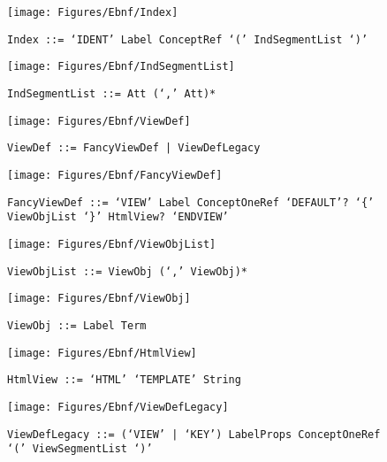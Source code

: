  \begin{figure}[H]
  \centering
  \texttt{[image: Figures/Ebnf/Index]}
  \caption*{\texttt{Index \small::=  `IDENT' Label ConceptRef `(' IndSegmentList `)'}}
  \label{fig:ebnf-Index}
 \end{figure}

 \begin{figure}[H]
  \centering
  \texttt{[image: Figures/Ebnf/IndSegmentList]}
  \caption*{\texttt{IndSegmentList \small::=  Att (`,' Att)*}}
  \label{fig:ebnf-IndSegmentList}
 \end{figure}

 \begin{figure}[H]
  \centering
  \texttt{[image: Figures/Ebnf/ViewDef]}
  \caption*{\texttt{ViewDef \small::=  FancyViewDef | ViewDefLegacy}}
  \label{fig:ebnf-ViewDef}
 \end{figure}

 \begin{figure}[H]
  \centering
  \texttt{[image: Figures/Ebnf/FancyViewDef]}
  \caption*{\texttt{FancyViewDef \small::=  `VIEW' Label ConceptOneRef `DEFAULT'? `\{' ViewObjList `\}' HtmlView? `ENDVIEW'}}
  \label{fig:ebnf-FancyViewDef}
 \end{figure}

 \begin{figure}[H]
  \centering
  \texttt{[image: Figures/Ebnf/ViewObjList]}
  \caption*{\texttt{ViewObjList \small::=  ViewObj (`,' ViewObj)*}}
  \label{fig:ebnf-ViewObjList}
 \end{figure}

 \begin{figure}[H]
  \centering
  \texttt{[image: Figures/Ebnf/ViewObj]}
  \caption*{\texttt{ViewObj \small::=  Label Term}}
  \label{fig:ebnf-ViewObj}
 \end{figure}

 \begin{figure}[H]
  \centering
  \texttt{[image: Figures/Ebnf/HtmlView]}
  \caption*{\texttt{HtmlView \small::=  `HTML' `TEMPLATE' String}}
  \label{fig:ebnf-HtmlView}
 \end{figure}

 \begin{figure}[H]
  \centering
  \texttt{[image: Figures/Ebnf/ViewDefLegacy]}
  \caption*{\texttt{ViewDefLegacy \small::=  (`VIEW' | `KEY') LabelProps ConceptOneRef `(' ViewSegmentList `)'}}
  \label{fig:ebnf-ViewDefLegacy}
 \end{figure}

